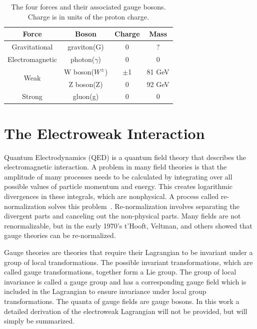 \begin{center}
\begin{table}[htb]
\caption{%
  \small The four forces and their associated gauge bosons. Charge is in units of the proton charge.%
}
\begin{center}
\begin{tabular}{ c c c c }
Force  & Boson    & Charge & Mass \\ \hline
Gravitational & graviton(G) & 0 & ? \\
Electromagnetic & photon($\gamma$) & 0 & 0 \\

\multirow{2}{*}{Weak} & W boson($W^{\pm}$) & $\pm$1 & 81 GeV \\
                      & Z boson(Z) & 0 & 92 GeV \\

Strong & gluon(g) & 0      & 0 \\
\end{tabular}
\end{center}
\label{tab:FundamentalForces}
\end{table}

\end{center}




\section{The Electroweak Interaction}

Quantum Electrodynamics (QED) is a quantum field theory that describes the electromagnetic interaction. A problem in many field theories is that the amplitude of many processes needs to be calculated by integrating over all possible values of particle momentum and energy.  This creates logarithmic divergences in these integrals, which are nonphysical. A process called re-normalization solves this problem~\cite{Peskin:1995}.  Re-normalization involves separating the divergent parts and canceling out the non-physical parts.  Many fields are not renormalizable, but in the early 1970's t'Hooft, Veltman, and others showed that gauge theories can be re-normalized\cite{Hooft:1971}\cite{Hooft:1972}.

Gauge theories are theories that require their Lagrangian to be invariant under a group of local transformations. The possible invariant transformations, which are called gauge transformations, together form a Lie group.  The group of local invariance is called a gauge group and has a corresponding gauge field which is included in the Lagrangian to ensure invariance under local group transformations.  The quanta of gauge fields are gauge bosons\cite{Wiki:Guage_Theory}.  In this work a detailed derivation of the electroweak Lagrangian will not be provided, but will simply be summarized.


